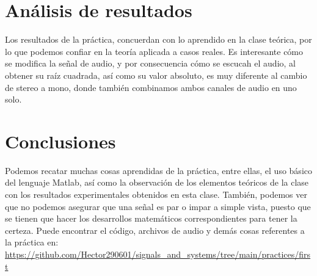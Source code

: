 \documentclass[12pt]{article}
\begin{document}
	\section{Análisis de resultados}
	Los resultados de la práctica, concuerdan con lo aprendido en la clase teórica, por lo que podemos confiar en la teoría aplicada a casos reales.
	Es interesante cómo se modifica la señal de audio, y por consecuencia cómo se escucah el audio, al obtener su raíz cuadrada, así como su valor absoluto, es muy diferente al cambio de stereo a mono, donde también combinamos ambos canales de audio en uno solo.
	\newpage
	\section{Conclusiones}
	Podemos recatar muchas cosas aprendidas de la práctica, entre ellas, el uso básico del lenguaje Matlab, así como la observación de los elementos teóricos de la clase con los resultados experimentales obtenidos en esta clase.
	También, podemos ver que no podemos asegurar que una señal es par o impar a simple vista, puesto que se tienen que hacer los desarrollos matemáticos correspondientes para tener la certeza.
	\newpage
	Puede encontrar el código, archivos de audio y demás cosas referentes a la práctica en:
	\url{https://github.com/Hector290601/signals_and_systems/tree/main/practices/first}
\end{document}
